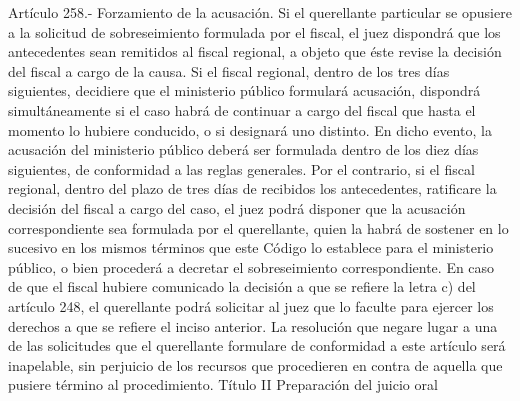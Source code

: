     Artículo 258.- Forzamiento de la acusación. Si el querellante particular se opusiere a la solicitud de sobreseimiento formulada por el fiscal, el juez dispondrá que los antecedentes sean remitidos al fiscal regional, a objeto que éste revise la decisión del fiscal a cargo de la causa.
    Si el fiscal regional, dentro de los tres días siguientes, decidiere que el ministerio público formulará acusación, dispondrá simultáneamente si el caso habrá de continuar a cargo del fiscal que hasta el momento lo hubiere conducido, o si designará uno distinto. En dicho evento, la acusación del ministerio público deberá ser formulada dentro de los diez días siguientes, de conformidad a las reglas generales.
    Por el contrario, si el fiscal regional, dentro del plazo de tres días de recibidos los antecedentes, ratificare la decisión del fiscal a cargo del caso, el juez podrá disponer que la acusación correspondiente sea formulada por el querellante, quien la habrá de sostener en lo sucesivo en los mismos términos que este Código lo establece para el ministerio público, o bien procederá a decretar el sobreseimiento correspondiente.
    En caso de que el fiscal hubiere comunicado la decisión a que se refiere la letra c) del artículo 248, el querellante podrá solicitar al juez que lo faculte para ejercer los derechos a que se refiere el inciso anterior.
    La resolución que negare lugar a una de las solicitudes que el querellante formulare de conformidad a este artículo será inapelable, sin perjuicio de los recursos que procedieren en contra de aquella que pusiere término al procedimiento.
    Título II
    Preparación del juicio oral

